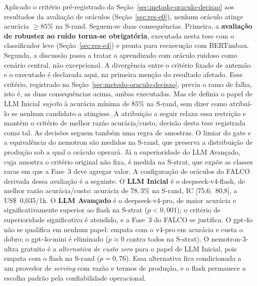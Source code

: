 Aplicado o critério pré-registrado da Seção~\ref{sec:metodo-oraculo-decisao}
aos resultados da avaliação de oráculos (Seção~\ref{sec:res-e0}), nenhum
oráculo atinge acurácia $\ge 85\%$ na S-rand. Seguem-se duas consequências.
Primeira, a \textbf{avaliação de robustez ao ruído torna-se obrigatória},
executada nesta tese com o classificador leve (Seção~\ref{sec:res-e4}) e pronta
para reexecução com BERTimbau. Segunda, a discussão passa a tratar o
aprendizado com oráculo ruidoso como cenário central, não excepcional. A
divergência entre o critério fixado de antemão e o executado é declarada aqui,
na primeira menção do resultado afetado. Esse critério, registrado na
Seção~\ref{sec:metodo-oraculo-decisao}, previa o ramo de falha, isto é, as duas
consequências acima, ambas executadas. Mas ele definia o papel de LLM Inicial
\emph{sujeito} à acurácia mínima de $85\%$ na S-rand, sem dizer como atribuí-lo
se nenhum candidato a atingisse. A atribuição a seguir relaxa essa restrição e
mantém o critério de melhor razão acurácia/custo, decisão desta tese registrada
como tal.
As decisões seguem também uma regra de amostras. O limiar do gate e a
equivalência do nemotron são medidos na S-rand, que preserva a distribuição de
produção sob a qual o oráculo operará. Já a superioridade do LLM Avançado, cuja
amostra o critério original não fixa, é medida na S-strat, que expõe as classes
raras em que a Fase~3 deve agregar valor. A configuração de oráculos do FALCO derivada dessa avaliação é a seguinte. O
\textbf{LLM Inicial} é o deepseek-v4-flash, de melhor razão acurácia/custo:
acurácia de $78{,}3\%$ na S-rand, IC [75,6;~80,8], a US\$~0,035/1k. O
\textbf{LLM Avançado} é o deepseek-v4-pro, de maior acurácia e
significativamente superior ao flash na S-strat ($p<0{,}001$); o critério de
superioridade significativa é atendido, e a Fase~3 do FALCO se justifica. O gpt-4o não se qualifica em
nenhum papel: empata com o v4-pro em acurácia e custa o dobro; o gpt-4o-mini
é eliminado ($p \approx 0$ contra todos na S-strat). O nemotron-3-ultra gratuito é a \emph{alternativa de custo zero} para o papel
de LLM Inicial, pois empata com o flash na S-rand ($p=0{,}76$). Essa
alternativa fica condicionada a um provedor de \textit{serving} com vazão e
termos de produção, e o flash permanece a escolha padrão pela confiabilidade
operacional.
